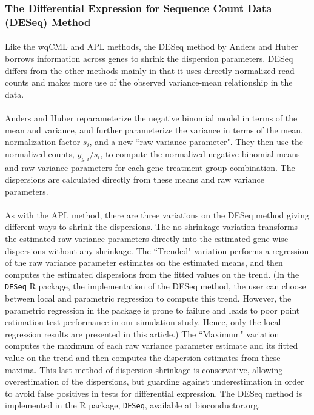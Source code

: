 \documentclass[10pt]{article}
\begin{document}
\subsubsection*{The Differential Expression for Sequence Count Data (DESeq) Method} \label{subsec:deseq}

\paragraph{} \indent Like the wqCML and APL methods, the DESeq method by Anders and Huber \cite{deseq} borrows information across genes to shrink the dispersion parameters. DESeq differs from the other methods mainly in that it uses directly normalized read counts and makes more use of the observed variance-mean relationship in the data.

\paragraph{} \indent Anders and Huber \cite{deseq} reparameterize the negative binomial model in terms of the mean and variance, and further parameterize the variance in terms of the mean, normalization factor $s_i$, and a new ``raw variance parameter". They then use the normalized counts, $y_{g, i}/s_i$, to compute the normalized negative binomial means and raw variance parameters for each gene-treatment group combination. The dispersions are calculated directly from these means and raw variance parameters.

\paragraph{} \indent As with the APL method, there are three variations on the DESeq method giving different ways to shrink the dispersions. The no-shrinkage variation transforms the estimated raw variance parameters directly into the estimated gene-wise dispersions without any shrinkage. The ``Trended" variation performs a regression of the raw variance parameter estimates on the estimated means, and then computes the estimated dispersions from the fitted values on the trend. (In the {\tt DESeq} R package, the implementation of the DESeq method, the user can choose between local and parametric regression to compute this trend. However, the parametric regression in the package is prone to failure and leads to poor point estimation test performance in our simulation study. Hence, only the local regression results are presented in this article.) The ``Maximum" variation computes the maximum of each raw variance parameter estimate and its fitted value on the trend and then computes the dispersion estimates from these maxima. This last method of dispersion shrinkage is conservative, allowing overestimation of the dispersions, but guarding against underestimation in order to avoid false positives in tests for differential expression. The DESeq method is implemented in the R package, {\tt DESeq}, available at {bioconductor.org}.
\end{document}
